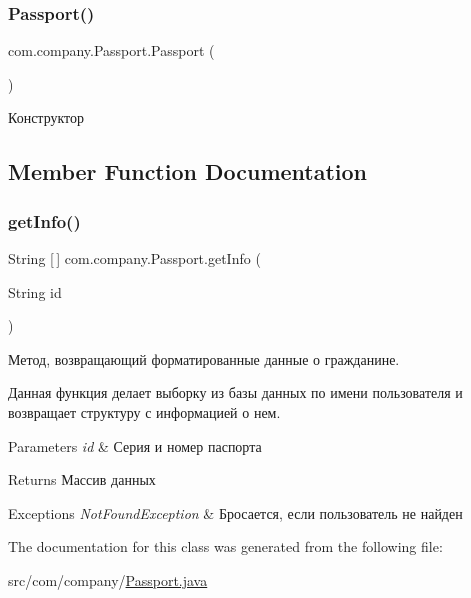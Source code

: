 \subsubsection{\texorpdfstring{Passport()}{Passport()}}
{\footnotesize\ttfamily com.\+company.\+Passport.\+Passport (\begin{DoxyParamCaption}{ }\end{DoxyParamCaption})\hspace{0.3cm}{\ttfamily [inline]}}



Конструктор 



\subsection{Member Function Documentation}
\mbox{\label{classcom_1_1company_1_1Passport_a13c307f5067950667804b5d2d1ecc5bf}} 
\subsubsection{\texorpdfstring{get\+Info()}{getInfo()}}
{\footnotesize\ttfamily String \mbox{[}$\,$\mbox{]} com.\+company.\+Passport.\+get\+Info (\begin{DoxyParamCaption}\item[{String}]{id }\end{DoxyParamCaption})\hspace{0.3cm}{\ttfamily [inline]}}



Метод, возвращающий форматированные данные о гражданине. 

Данная функция делает выборку из базы данных по имени пользователя и возвращает структуру с информацией о нем. 
\begin{DoxyParams}{Parameters}
{\em id} & Серия и номер паспорта \\
\hline
\end{DoxyParams}
\begin{DoxyReturn}{Returns}
Массив данных 
\end{DoxyReturn}

\begin{DoxyExceptions}{Exceptions}
{\em Not\+Found\+Exception} & Бросается, если пользователь не найден \\
\hline
\end{DoxyExceptions}


The documentation for this class was generated from the following file\+:\begin{DoxyCompactItemize}
\item 
src/com/company/\mbox{\hyperlink{Passport_8java}{Passport.\+java}}\end{DoxyCompactItemize}
